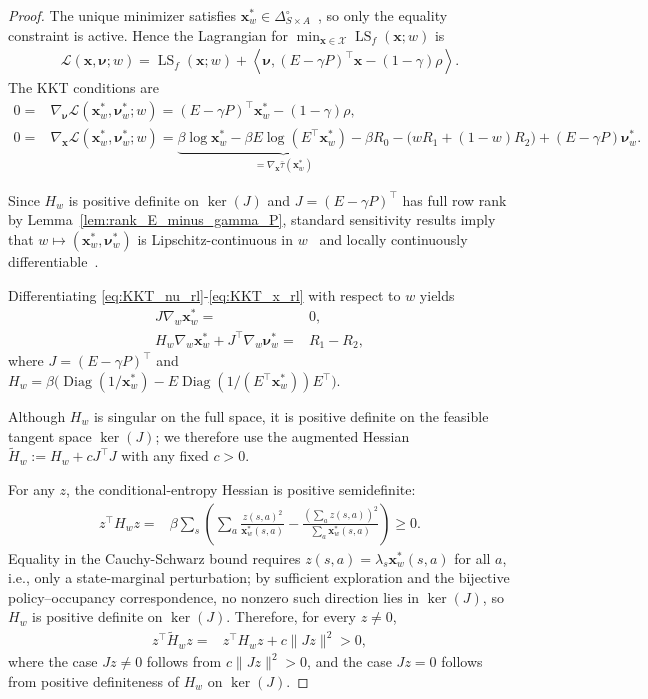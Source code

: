 \documentclass{article}
\newcommand{\bx}{\mathbf{x}}
\newcommand{\X}{\mathcal{X}}
\newcommand{\LS}{\operatorname{LS}}
\newcommand{\Diag}{\operatorname{Diag}}
\begin{document}
\begin{proof}
The unique minimizer satisfies $\bx_w^*\in\Delta_{S\times A}^{\circ}$~\citep{muller2026optimal}, so only the equality constraint is active. Hence the Lagrangian for $\min_{\bx\in\X}\LS_f(\bx;w)$ is
\begin{align}
\mathcal L(\bx,\boldsymbol{\nu};w)=\LS_f(\bx;w)+\left\langle\boldsymbol{\nu},(E-\gamma P)^\top \bx-(1-\gamma)\rho\right\rangle .
\end{align}
The KKT conditions are
\begin{align}
0
=& \nabla_{\boldsymbol{\nu}}\mathcal L(\bx_w^*,\boldsymbol{\nu}_w^*;w)
=(E-\gamma P)^\top \bx_w^*-(1-\gamma)\rho,
\label{eq:KKT_nu_rl}\\
0
=& \nabla_{\bx}\mathcal L(\bx_w^*,\boldsymbol{\nu}_w^*;w)
=\underbrace{\beta\log\bx_w^*-\beta E\log(E^\top\bx_w^*)-\beta R_0}_{=\nabla_{\bx}\bar\tau(\bx_w^*)}-\bigl(wR_1+(1-w)R_2\bigr)+(E-\gamma P)\boldsymbol{\nu}_w^* .
\label{eq:KKT_x_rl}
\end{align}

Since $H_w$ is positive definite on $\ker(J)$ and $J=(E-\gamma P)^\top$ has full row rank by Lemma~\ref{lem:rank_E_minus_gamma_P}, standard sensitivity results imply that $w\mapsto(\bx_w^*,\boldsymbol{\nu}_w^*)$ is Lipschitz-continuous in $w$~\citep[Theorem 2.16]{ito2008lagrange} and locally continuously differentiable~\cite[Theorem 2.1]{fiacco1976sensitivity}.

Differentiating \eqref{eq:KKT_nu_rl}-\eqref{eq:KKT_x_rl} with respect to $w$ yields
\begin{align}
J\nabla_w\bx_w^*
=& 0,
\label{eq:diff_kkt_eq_rl}\\
H_w\nabla_w\bx_w^*+J^\top\nabla_w\boldsymbol{\nu}_w^*
=& R_1-R_2,
\label{eq:diff_kkt_stat_rl}
\end{align}
where $J=(E-\gamma P)^\top$ and $H_w=\beta\bigl(\Diag(1/\bx_w^*)-E\Diag(1/(E^\top\bx_w^*))E^\top\bigr)$.

Although $H_w$ is singular on the full space, it is positive definite on the feasible tangent space $\ker(J)$; we therefore use the augmented Hessian $\widetilde H_w:=H_w+cJ^\top J$ with any fixed $c>0$.

For any $z$, the conditional-entropy Hessian is positive semidefinite:
\begin{align}
z^\top H_w z
=& \beta\sum_s\left(\sum_a\frac{z(s,a)^2}{\bx_w^*(s,a)}-\frac{\left(\sum_a z(s,a)\right)^2}{\sum_a\bx_w^*(s,a)}\right)
\ge 0 .
\end{align}
Equality in the Cauchy-Schwarz bound requires $z(s,a)=\lambda_s\bx_w^*(s,a)$ for all $a$, i.e., only a state-marginal perturbation; by sufficient exploration and the bijective policy--occupancy correspondence, no nonzero such direction lies in $\ker(J)$, so $H_w$ is positive definite on $\ker(J)$. Therefore, for every $z\ne0$,
\begin{align}
z^\top \widetilde H_w z
=& z^\top H_w z+c\|Jz\|^2
>0,
\end{align}
where the case $Jz\ne0$ follows from $c\|Jz\|^2>0$, and the case $Jz=0$ follows from positive definiteness of $H_w$ on $\ker(J)$. 


\end{proof}
\end{document}
